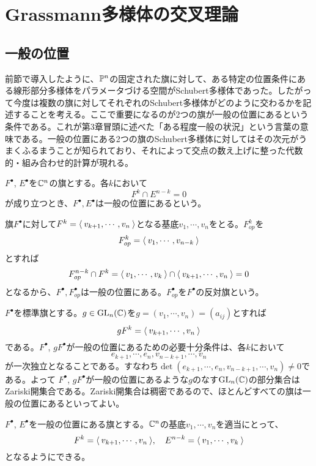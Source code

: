 \documentclass{ltjsreport}
\begin{document}
\section{Grassmann多様体の交叉理論}
\subsection{一般の位置}

前節で導入したように、$\mathbb{P}^n$の固定された旗に対して、ある特定の位置条件にある線形部分多様体をパラメータづける空間がSchubert多様体であった。したがって今度は複数の旗に対してそれぞれのSchubert多様体がどのように交わるかを記述することを考える。ここで重要になるのが2つの旗が一般の位置にあるという条件である。これが第3章冒頭に述べた「ある程度一般の状況」という言葉の意味である。一般の位置にある2つの旗のSchubert多様体に対してはその次元がうまくふるまうことが知られており、それによって交点の数え上げに整った代数的・組み合わせ的計算が現れる。

\begin{defin}
  $F^\bullet$, $E^\bullet$を$\mathbb{C}^n$の旗とする。各$k$において
  \[
  F^k\cap E^{n-k}=0  
  \]
  が成り立つとき、$F^\bullet,E^\bullet$は一般の位置にあるという。
\end{defin}

\begin{eg}
  旗$F^\bullet$に対して$F^k=\langle\:v_{k+1},\cdots,v_n\:\rangle$となる基底$v_1,\cdots,v_n$をとる。$F^k_{op}$を
  \[
  F^k_{op}=\langle\:v_1,\cdots,v_{n-k}\:\rangle  
  \]
  とすれば
  \[
  F^{n-k}_{op}\cap F^k=\langle\:v_1,\cdots,v_k\:\rangle\cap\langle\:v_{k+1},\cdots,v_n\:\rangle  =0
  \]
  となるから、$F^\bullet,F^\bullet_{op}$は一般の位置にある。$F^\bullet_{op}$を$F^\bullet$の反対旗という。
\end{eg}

\begin{eg}
  $F^\bullet$を標準旗とする。$g\in \text{GL}_n(\mathbb{C})$を$g=(v_1,\cdots,v_n)=(a_{ij})$とすれば
  \[
  gF^k=\langle\:v_{k+1},\cdots,v_n\:\rangle
  \]
  である。$F^\bullet$, $gF^\bullet$が一般の位置にあるための必要十分条件は、各$k$において
  \[
  e_{k+1},\cdots,e_n,v_{n-k+1},\cdots,v_n  
  \]
  が一次独立となることである。すなわち$\det(e_{k+1},\cdots,e_n,v_{n-k+1},\cdots,v_n)\neq 0$である。よって
  $F^\bullet$, $gF^\bullet$が一般の位置にあるような$g$のなす$\text{GL}_n(\mathbb{C})$の部分集合はZariski開集合である。Zariski開集合は稠密であるので、ほとんどすべての旗は一般の位置にあるといってよい。
\end{eg}

\begin{prop}\label{flag_basis}
  $F^\bullet$, $E^\bullet$を一般の位置にある旗とする。$\mathbb{C}^n$の基底$v_1,\cdots,v_n$を適当にとって、
  \[
  F^k=\langle\:v_{k+1},\cdots,v_n\:\rangle, \quad E^{n-k}=\langle\:v_1,\cdots,v_k\:\rangle  
  \]
  となるようにできる。
\end{prop}
\end{document}
